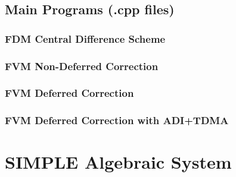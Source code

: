 \documentclass[12pt]{article}
\theoremstyle{plain}  %
\theoremstyle{definition}  %
\begin{document}
\subsection{Main Programs (.cpp files)}

\subsubsection{FDM Central Difference Scheme}
\label{subsec:code4} 


\subsubsection{FVM Non-Deferred Correction}
\label{subsec:code5} 


\subsubsection{FVM Deferred Correction}
\label{subsec:code6} 


\subsubsection{FVM Deferred Correction with ADI+TDMA}
\label{subsec:code7} 


\newpage
\section{SIMPLE Algebraic System}
\label{app:simple_algebraic}
\end{document}
